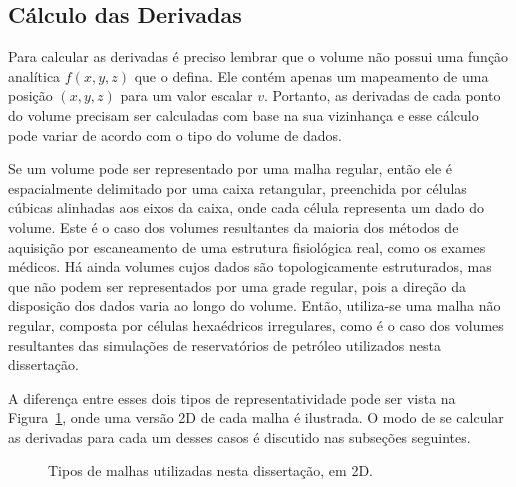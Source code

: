 \subsection{Cálculo das Derivadas}
	Para calcular as derivadas é preciso lembrar que o volume não possui uma função analítica $ f(x, y, z) $ que o defina. Ele contém apenas um mapeamento de uma posição $ (x, y, z) $ para um valor escalar $ v $. Portanto, as derivadas de cada ponto do volume precisam ser calculadas com base na sua vizinhança e esse cálculo pode variar de acordo com o tipo do volume de dados.
	
	Se um volume pode ser representado por uma malha regular, então ele é espacialmente delimitado por uma caixa retangular, preenchida por células cúbicas alinhadas aos eixos da caixa, onde cada célula representa um dado do volume. Este é o caso dos volumes resultantes da maioria dos métodos de aquisição por escaneamento de uma estrutura fisiológica real, como os exames médicos. Há ainda volumes cujos dados são topologicamente estruturados, mas que não podem ser representados por uma grade regular, pois a direção da disposição dos dados varia ao longo do volume. Então, utiliza-se uma malha não regular, composta por células hexaédricos irregulares, como é o caso dos volumes resultantes das simulações de reservatórios de petróleo utilizados nesta dissertação.
	
	A diferença entre esses dois tipos de representatividade pode ser vista na Figura~\ref{fig:meshes}, onde uma versão 2D de cada malha é ilustrada. O modo de se calcular as derivadas para cada um desses casos é discutido nas subseções seguintes.
	
\begin{figure}[h]
	\centering
	\hspace{10mm}
	\caption{Tipos de malhas utilizadas nesta dissertação, em 2D.}
	\label{fig:meshes}
\end{figure}
    
